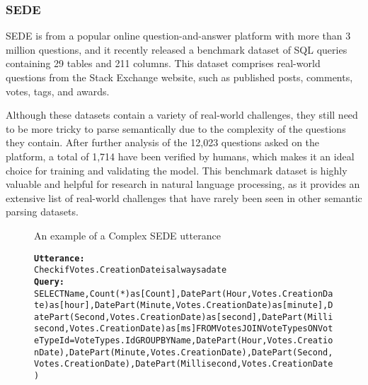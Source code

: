 \subsubsection{SEDE}

\ac{SEDE} \cite{DBLP:journals/corr/abs-2106-05006} is from a popular online question-and-answer platform with more than 3 million questions, and it recently released a benchmark dataset of SQL queries containing 29 tables and 211 columns. This dataset comprises real-world questions from the Stack Exchange website, such as published posts, comments, votes, tags, and awards.

Although these datasets contain a variety of real-world challenges, they still need to be more tricky to parse semantically due to the complexity of the questions they contain. After further analysis of the 12,023 questions asked on the platform, a total of 1,714 have been verified by humans, which makes it an ideal choice for training and validating the model. This benchmark dataset is highly valuable and helpful for research in natural language processing, as it provides an extensive list of real-world challenges that have rarely been seen in other semantic parsing datasets.

\begin{figure}[H]
    \label{fig:sede_sql}
    \begin{AIbox}{An example of a Complex SEDE utterance}
        \vspace{-5px}
        \parbox{1\textwidth}{\scriptsize
        \begin{alltt} 
            {\bf Utterance:} \\ 
            Check if Votes.CreationDate is always a date
            \\
            {\bf Query:} \\
            SELECT Name, Count(*)as [Count], DatePart(Hour, Votes.CreationDate)as [hour],DatePart(Minute, Votes.CreationDate)as [minute],DatePart(Second, Votes.CreationDate)as [second],DatePart(Millisecond, Votes.CreationDate)as [ms] FROM Votes JOIN VoteTypes ON VoteTypeId = VoteTypes.Id GROUP BY Name, DatePart(Hour, Votes.CreationDate),DatePart(Minute, Votes.CreationDate),DatePart(Second, Votes.CreationDate),DatePart(Millisecond, Votes.CreationDate)
        \end{alltt}
        }
        \vspace{-5px}
    \end{AIbox}
\end{figure}